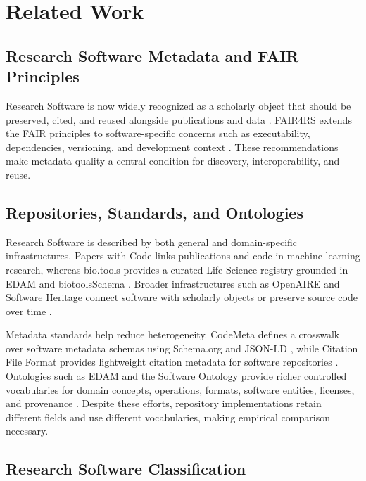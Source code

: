 \documentclass[pdflatex,sn-mathphys-num]{sn-jnl}%
\theoremstyle{thmstyleone}%
\theoremstyle{thmstyletwo}%
\theoremstyle{thmstylethree}%
\begin{document}
\section{Related Work}
\label{sec:related}

\subsection{Research Software Metadata and FAIR Principles}
\label{subsec:related-rs-metadata}

Research Software is now widely recognized as a scholarly object that should be preserved, cited, and reused alongside publications and data \cite{Katz2014,Smith2016SoftwareCitation}. FAIR4RS extends the FAIR principles to software-specific concerns such as executability, dependencies, versioning, and development context \cite{Lamprecht2020FAIRSoftware,Barker2022FAIR4RS,FAIR4RS2022Principles}. These recommendations make metadata quality a central condition for discovery, interoperability, and reuse.

\subsection{Repositories, Standards, and Ontologies}
\label{subsec:related-registries}

Research Software is described by both general and domain-specific infrastructures. Papers with Code links publications and code in machine-learning research, whereas bio.tools provides a curated Life Science registry grounded in EDAM and biotoolsSchema \cite{Ison2013EDAM,Ison2019BioTools,Ison2021BioToolsSchema}. Broader infrastructures such as OpenAIRE and Software Heritage connect software with scholarly objects or preserve source code over time \cite{Manghi2023OpenAIRE,DiCosmo2020SWH}.

Metadata standards help reduce heterogeneity. CodeMeta defines a crosswalk over software metadata schemas using Schema.org and JSON-LD \cite{Jones2019CodeMeta}, while Citation File Format provides lightweight citation metadata for software repositories \cite{Druskat2021CFF}. Ontologies such as EDAM and the Software Ontology provide richer controlled vocabularies for domain concepts, operations, formats, software entities, licenses, and provenance \cite{Ison2013EDAM,Malone2014SWO}. Despite these efforts, repository implementations retain different fields and use different vocabularies, making empirical comparison necessary.

\subsection{Research Software Classification}
\label{subsec:related-classification}
\end{document}
